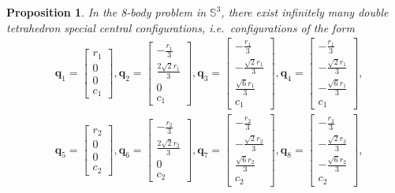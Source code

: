\documentclass[12pt]{amsart}
\newtheorem{proposition}{Proposition}
\theoremstyle{definition}
\def \mb{\mathbb}
\def \S{\mb S}        %
\newcommand {\q} {\mathbf{q}}
\begin{document}
{\begin{proposition}In the 8-body problem in $\S^3$, there exist infinitely many double tetrahedron special central configurations, i.e.\ configurations of the form 
\begin{align*}
&\q_1=\begin{bmatrix}r_1 \\ 0 \\ 0 \\ c_1\end{bmatrix}, \q_2=\begin{bmatrix}-\frac{r_1}{3} \\ \frac{2\sqrt{2}r_1}{3} \\ 0 \\ c_1\end{bmatrix}, \q_3=\begin{bmatrix}-\frac{r_1}{3}\\-\frac{\sqrt{2}r_1}{3}\\ \frac{\sqrt{6}r_1}{3}\\c_1\end{bmatrix}, \q_4=\begin{bmatrix} -\frac{r_1}{3}\\-\frac{\sqrt{2}r_1}{3}\\-\frac{\sqrt{6}r_1}{3}\\c_1\end{bmatrix},\\
&\q_5=\begin{bmatrix}r_2 \\ 0 \\ 0 \\ c_2\end{bmatrix}, \q_6=\begin{bmatrix}-\frac{r_2}{3} \\ \frac{2\sqrt{2}r_2}{3} \\ 0 \\ c_2\end{bmatrix}, \q_7=\begin{bmatrix}-\frac{r_2}{3}\\-\frac{\sqrt{2}r_2}{3}\\ \frac{\sqrt{6}r_2}{3}\\c_2\end{bmatrix}, \q_8=\begin{bmatrix} -\frac{r_2}{3}\\-\frac{\sqrt{2}r_2}{3}\\-\frac{\sqrt{6}r_2}{3}\\c_2\end{bmatrix},\\

\end{align*}
\end{proposition}}
\end{document}
